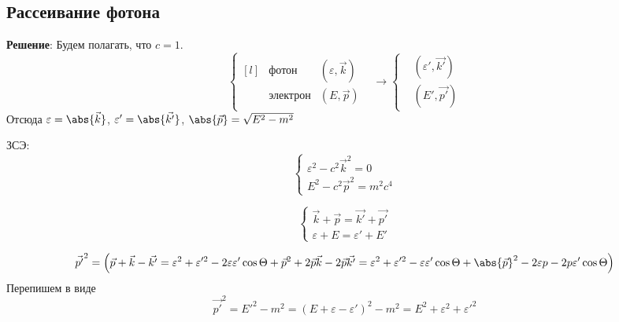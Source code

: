 \subsection{Рассеивание фотона}
\begin{problem}
\end{problem}

\textbf{Решение}:
Будем полагать, что $c = 1$.
\[
\left\{
\begin{aligned}[l]
	&\text{фотон} &(\varepsilon, \vec{k})& \\
	&\text{электрон} &\left(E, \vec{p}\right)
\end{aligned}
\rightarrow
\left\{
\begin{aligned}
	&(\varepsilon', \vec{k'}) \\
	&(E', \vec{p'})
\end{aligned}
\right.
\right.
\]
Отсюда $\varepsilon = \abs{\vec{k}}$, 
	$\varepsilon' = \abs{\vec{k'}}$,
	$\abs{\vec{p}} = \sqrt{E^2 - m^2}$

ЗСЭ:
$$
\begin{cases}
	\varepsilon^2 - c^2 \vec{k}^2 = 0 \\
	E^2 - c^2 \vec{p}^2 = m^2 c^4
\end{cases}
$$


$$
\begin{cases}
	\vec{k} + \vec{p} = \vec{k'} + \vec{p'} \\
	\varepsilon + E = \varepsilon' + E'
\end{cases}
$$

\begin{dmath}
	\vec{p'}^2 = \left(%
\vec{p} + \vec{k} - \vec{k'} =%
\varepsilon^2 + \varepsilon'^2 - 2 \varepsilon \varepsilon' \cos{\Theta} + \vec{p}^2 + 2 \vec{p} \vec{k} - 2\vec{p} \vec{k'} =%
\varepsilon^2 + \varepsilon'^2 - \varepsilon \varepsilon' \cos{\Theta} + \abs{\vec{p}}^2 - 2 \varepsilon p - 2 p \varepsilon' \cos{\Theta}%
\right)
\end{dmath}
Перепишем в виде
$$
\vec{p'}^2 = E'^2 - m^2 = \left(E + \varepsilon - \varepsilon'\right)^2 - m^2 = E^2 + \varepsilon^2 + \varepsilon'^2
$$